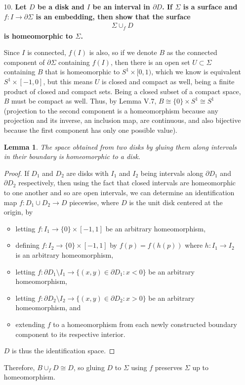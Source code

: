 \documentclass[a4paper,12pt]{article}
\newtheorem{lemma}[theorem]{Lemma}
\begin{document}
\begin{enumerate}
    \item[10.]
        \boldmath\textbf{Let $D$ be a disk and $I$ be an interval in $\partial D$. If $\Sigma$ is a surface and $f : I \to \partial \Sigma$ is an embedding, then show that the surface
            \begin{align*}
                \Sigma \cup_f D
            \end{align*}
            is homeomorphic to $\Sigma$.
        }\unboldmath \par
        Since $I$ is connected, $f(I)$ is also, so if we denote $B$ as the connected component of $\partial \Sigma$ containing $f(I)$, then there is an open set $U \subset \Sigma$ containing $B$ that is homeomorphic to $S^1 \times [0, 1)$, which we know is equivalent $S^1 \times [-1, 0]$, but this means $U$ is closed and compact as well, being a finite product of closed and compact sets. Being a closed subset of a compact space, $B$ must be compact as well. Thus, by Lemma V.7, $B \cong \{0\} \times S^1 \cong S^1$ (projection to the second component is a homeomorphism because any projection and its inverse, an inclusion map, are continuous, and also bijective because the first component has only one possible value).
        \begin{lemma}
            The space obtained from two disks by gluing them along intervals in their boundary is homeomorphic to a disk.
        \end{lemma}
        \begin{proof}
            If $D_1$ and $D_2$ are disks with $I_1$ and $I_2$ being intervals along $\partial D_1$ and $\partial D_2$ respectively, then using the fact that closed intervals are homeomorphic to one another and so are open intervals, we can determine an identification map $f : D_1 \cup D_2 \to D$ piecewise, where $D$ is the unit disk centered at the origin, by
            \begin{itemize}
                \item 
                    letting $f : I_1 \to \{0\} \times [-1, 1]$ be an arbitrary homeomorphism,
                \item
                    defining $f : I_2 \to \{0\} \times [-1, 1]$ by $f(p) = f(h(p))$ where $h : I_1 \to I_2$ is an arbitrary homeomorphism,
                \item
                    letting $f : \partial D_1 \setminus I_1 \to \{ (x, y) \in \partial D_1 : x < 0 \}$ be an arbitrary homeomorphism,
                \item
                    letting $f : \partial D_2 \setminus I_2 \to \{ (x, y) \in \partial D_2 : x > 0 \}$ be an arbitrary homeomorphism, and
                \item
                    extending $f$ to a homeomorphism from each newly constructed boundary component to its respective interior.
            \end{itemize}
            $D$ is thus the identification space.
        \end{proof}
        Therefore, $B \cup_f D \cong D$, so gluing $D$ to $\Sigma$ using $f$ preserves $\Sigma$ up to homeomorphism.


\end{enumerate}
\end{document}

